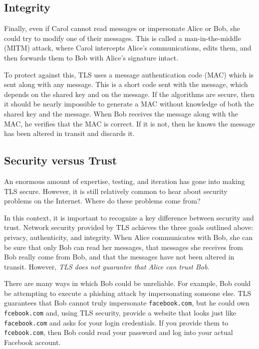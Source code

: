 \subsection{Integrity}

Finally, even if Carol cannot read messages or impersonate Alice or Bob, she could try to modify one of their messages. This is called a man-in-the-middle (MITM) attack, where Carol intercepts Alice's communications, edits them, and then forwards them to Bob with Alice's signature intact.

To protect against this, TLS uses a message authentication code (MAC) which is sent along with any message. This is a short code sent with the message, which depends on the shared key and on the message. If the algorithms are secure, then it should be nearly impossible to generate a MAC without knowledge of both the shared key and the message. When Bob receives the message along with the MAC, he verifies that the MAC is correct. If it is not, then he knows the message has been altered in transit and discards it.

\subsection{Security versus Trust}

An enormous amount of expertise, testing, and iteration has gone into making TLS secure. However, it is still relatively common to hear about security problems on the Internet. Where do these problems come from?

In this context, it is important to recognize a key difference between security and trust. Network security provided by TLS achieves the three goals outlined above: privacy, authenticity, and integrity. When Alice communicates with Bob, she can be sure that only Bob can read her messages, that messages she receives from Bob really come from Bob, and that the messages have not been altered in transit. However, \emph{TLS does not guarantee that Alice can trust Bob}.

There are many ways in which Bob could be unreliable. For example, Bob could be attempting to execute a phishing attack by impersonating someone else. TLS guarantees that Bob cannot truly impersonate \texttt{facebook.com}, but he could own \texttt{fcebook.com} and, using TLS security, provide a website that looks just like \texttt{facebook.com} and asks for your login credentials. If you provide them to \texttt{fcebook.com}, then Bob could read your password and log into your actual Facebook account.


